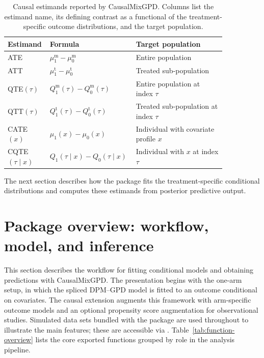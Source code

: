 \documentclass[11pt]{article}\usepackage[]{graphicx}\usepackage[]{xcolor}
\newcommand{\pkg}[1]{\textsf{#1}}
\newcommand{\code}[1]{\texttt{\detokenize{#1}}}
\begin{document}
\begin{table}[!htbp]
\centering
\small
\caption[Causal estimands reported by the package]{Causal estimands reported by \protect\pkg{CausalMixGPD}. Columns list the estimand name, its defining contrast as a functional of the treatment-specific outcome distributions, and the target population.}
\label{tab:causal-estimands-main}
{
\renewcommand{\arraystretch}{1.08}
\begin{tabular}{
  @{}>{\raggedright\arraybackslash}p{0.15\linewidth}
  >{\centering\arraybackslash}p{0.30\linewidth}
  >{\raggedright\arraybackslash}p{0.40\linewidth}@{}
}
\toprule
Estimand & Formula & Target population \\
\midrule
ATE & $\mu_1^{\mathrm{m}}-\mu_0^{\mathrm{m}}$ & Entire population \\
ATT & $\mu_1^{\mathrm{t}}-\mu_0^{\mathrm{t}}$ & Treated sub-population \\
QTE$(\tau)$ & $Q_1^{\mathrm{m}}(\tau)-Q_0^{\mathrm{m}}(\tau)$ & Entire population at index $\tau$\\
QTT$(\tau)$ & $Q_1^{\mathrm{t}}(\tau)-Q_0^{\mathrm{t}}(\tau)$ & Treated sub-population at index $\tau$\\
CATE$(x)$ & $\mu_1(x)-\mu_0(x)$ & Individual with covariate profile $x$ \\
CQTE$(\tau\mid x)$ & $Q_1(\tau\mid x)-Q_0(\tau\mid x)$ & Individual with $x$ at index $\tau$\\
\bottomrule
\end{tabular}
}
\end{table}

The next section describes how the package fits the treatment-specific
conditional distributions and computes these estimands from posterior
predictive output.


\section{Package overview: workflow, model, and inference}
\label{sec:overview}

This section describes the workflow for fitting conditional models and
obtaining predictions with \pkg{CausalMixGPD}.  The presentation
begins with the one-arm setup, in which the spliced DPM--GPD model is
fitted to an outcome conditional on covariates. The causal extension augments this
framework with arm-specific outcome models and an optional propensity
score augmentation for observational studies.
Simulated data sets bundled with the package are used throughout to
illustrate the main features; these are accessible via
\code{data()}.
Table~\ref{tab:function-overview} lists the core exported functions
grouped by role in the analysis pipeline.
\end{document}
